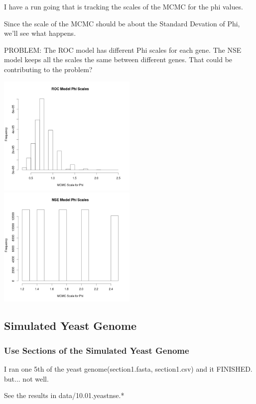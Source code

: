 I have a run going that is tracking the scales of the MCMC for the phi values.

Since the scale of the MCMC should be about the Standard Devation of Phi, we'll see what happens.

PROBLEM:
The ROC model has different Phi scales for each gene. The NSE model keeps all the scales the same between different genes. That could be contributing to the problem?

\includegraphics[width=0.5\textwidth]{data/oct10-roc-scalehist.png}
\includegraphics[width=0.5\textwidth]{data/oct10-nse-scalehist.png}


\subsection{Simulated Yeast Genome}

\subsubsection{Use Sections of the Simulated Yeast Genome}
I ran one 5th of the yeast genome(section1.fasta, section1.csv) and it FINISHED. but... not well.

See the results in data/10.01.yeastnse.*

